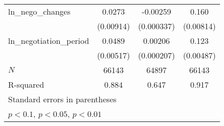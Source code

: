 {\begin{tabular}{l*{3}{c}}
\addlinespace
ln\_nego\_changes&      0.0273\sym{***}&    -0.00259\sym{***}&       0.160\sym{***}\\
            &   (0.00914)         &  (0.000337)         &   (0.00814)         \\
\addlinespace
ln\_negotiation\_period&      0.0489\sym{***}&     0.00206\sym{***}&       0.123\sym{***}\\
            &   (0.00517)         &  (0.000207)         &   (0.00487)         \\
\midrule
\(N\)       &       66143         &       64897         &       66143         \\
R-squared   &       0.884         &       0.647         &       0.917         \\
\bottomrule
\multicolumn{4}{l}{\footnotesize Standard errors in parentheses}\\
\multicolumn{4}{l}{\footnotesize \sym{*} \(p<0.1\), \sym{**} \(p<0.05\), \sym{***} \(p<0.01\)}\\
\end{tabular}
}
